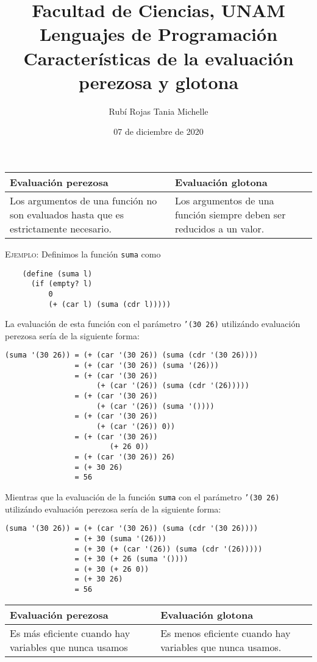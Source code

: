 \documentclass[letterpaper,11pt]{article}
\title{Facultad de Ciencias, UNAM \\ 
       Lenguajes de Programación\\ 
       Características de la evaluación perezosa y glotona}
\author{Rubí Rojas Tania Michelle}
\date{07 de diciembre de 2020}
\begin{document}
\maketitle

\begin{table}[ht]
    \centering  
    \begin{tabular}{|L|L|}
        \hline
        Evaluación perezosa & Evaluación glotona \\
        \hline 
        Los argumentos de una función no son evaluados hasta que es 
        estrictamente necesario. &
        Los argumentos de una función siempre deben ser reducidos a un valor.\\
        \hline
    \end{tabular}
\end{table}

\textsc{Ejemplo:} Definimos la función \texttt{suma} como
\begin{verbatim}
    (define (suma l)
      (if (empty? l)
          0
          (+ (car l) (suma (cdr l)))))
\end{verbatim}

La evaluación de esta función con el parámetro \texttt{'(30 26)}
utilizándo evaluación perezosa sería de la siguiente forma:
\begin{verbatim}
(suma '(30 26)) = (+ (car '(30 26)) (suma (cdr '(30 26))))
                = (+ (car '(30 26)) (suma '(26)))
                = (+ (car '(30 26)) 
                     (+ (car '(26)) (suma (cdr '(26)))))
                = (+ (car '(30 26)) 
                     (+ (car '(26)) (suma '())))
                = (+ (car '(30 26)) 
                     (+ (car '(26)) 0))
                = (+ (car '(30 26)) 
                        (+ 26 0))
                = (+ (car '(30 26)) 26)
                = (+ 30 26)
                = 56
\end{verbatim}

Mientras que la evaluación de la función \texttt{suma} con el parámetro 
\texttt{'(30 26)} utilizándo evaluación perezosa sería de la siguiente forma:
\begin{verbatim}
(suma '(30 26)) = (+ (car '(30 26)) (suma (cdr '(30 26))))
                = (+ 30 (suma '(26)))
                = (+ 30 (+ (car '(26)) (suma (cdr '(26)))))
                = (+ 30 (+ 26 (suma '())))
                = (+ 30 (+ 26 0))
                = (+ 30 26)
                = 56
\end{verbatim}

\begin{table}[ht]
    \centering  
    \begin{tabular}{|L|L|}
        \hline
        Evaluación perezosa & Evaluación glotona \\
        \hline 
        Es más eficiente cuando hay variables que nunca usamos & 
        Es menos eficiente cuando hay variables que nunca 
        usamos. \\
        \hline
    \end{tabular}
\end{table}
\end{document}
